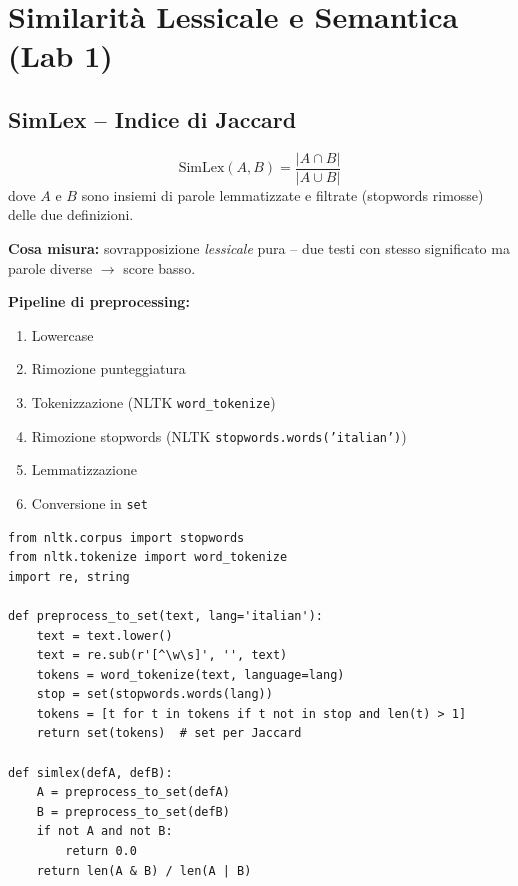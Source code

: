 \documentclass[12pt,a4paper]{article}
\begin{document}
\section{Similarit\`a Lessicale e Semantica (Lab 1)}

\subsection{SimLex -- Indice di Jaccard}\label{sec:simlex}

\begin{formulabox}
\[
\text{SimLex}(A, B) = \frac{|A \cap B|}{|A \cup B|}
\]
dove $A$ e $B$ sono insiemi di parole lemmatizzate e filtrate (stopwords rimosse) delle due definizioni.
\end{formulabox}

\textbf{Cosa misura:} sovrapposizione \emph{lessicale} pura -- due testi con stesso significato ma parole diverse $\to$ score basso.

\textbf{Pipeline di preprocessing:}
\begin{enumerate}
  \item Lowercase
  \item Rimozione punteggiatura
  \item Tokenizzazione (NLTK \texttt{word\_tokenize})
  \item Rimozione stopwords (NLTK \texttt{stopwords.words('italian')})
  \item Lemmatizzazione
  \item Conversione in \texttt{set}
\end{enumerate}

\begin{codebox}
\begin{lstlisting}[style=python]
from nltk.corpus import stopwords
from nltk.tokenize import word_tokenize
import re, string

def preprocess_to_set(text, lang='italian'):
    text = text.lower()
    text = re.sub(r'[^\w\s]', '', text)
    tokens = word_tokenize(text, language=lang)
    stop = set(stopwords.words(lang))
    tokens = [t for t in tokens if t not in stop and len(t) > 1]
    return set(tokens)  # set per Jaccard

def simlex(defA, defB):
    A = preprocess_to_set(defA)
    B = preprocess_to_set(defB)
    if not A and not B:
        return 0.0
    return len(A & B) / len(A | B)
\end{lstlisting}
\end{codebox}
\end{document}
